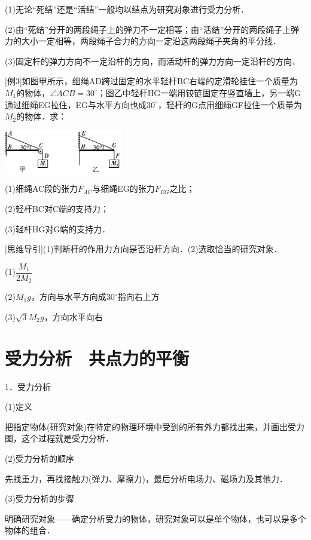 (1)无论``死结''还是``活结''一般均以结点为研究对象进行受力分析．

(2)由``死结''分开的两段绳子上的弹力不一定相等；由``活结''分开的两段绳子上弹力的大小一定相等，两段绳子合力的方向一定沿这两段绳子夹角的平分线．

(3)固定杆的弹力方向不一定沿杆的方向，而活动杆的弹力方向一定沿杆的方向．

{[}例3{]}如图甲所示，细绳AD跨过固定的水平轻杆BC右端的定滑轮挂住一个质量为$M_1$的物体，$\angle ACB=30^\circ$；图乙中轻杆HG一端用铰链固定在竖直墙上，另一端G通过细绳EG拉住，EG与水平方向也成$30^\circ$，轻杆的G点用细绳GF拉住一个质量为$M_2$的物体．求：

\begin{center}\includegraphics[width=2.03125in,height=0.71875in]{media/image74.png}\end{center}

(1)细绳AC段的张力$F_{AC}$与细绳EG的张力$F_{EG}$之比；

(2)轻杆BC对C端的支持力；

(3)轻杆HG对G端的支持力．

{[}思维导引{]}(1)判断杆的作用力方向是否沿杆方向．(2)选取恰当的研究对象．
\begin{solution}

	(1)$\dfrac{M_1}{2M_2}$　
	
	(2)$M_1g$，方向与水平方向成$30^\circ$指向右上方
	
	(3)$\sqrt{3} M_2g$，方向水平向右
\end{solution}


\newpage
\section{受力分析　共点力的平衡}


1．受力分析

(1)定义

把指定物体(研究对象)在特定的物理环境中受到的所有外力都找出来，并画出受力图，这个过程就是受力分析．

(2)受力分析的顺序

先找重力，再找接触力(弹力、摩擦力)，最后分析电场力、磁场力及其他力．

(3)受力分析的步骤

明确研究对象------确定分析受力的物体，研究对象可以是单个物体，也可以是多个物体的组合．

